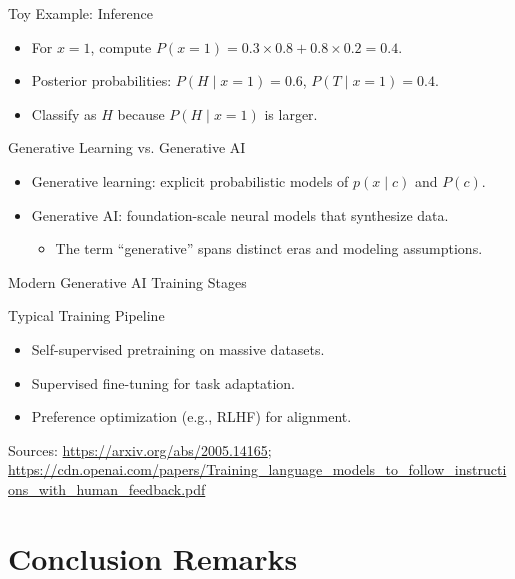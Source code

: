 \documentclass[10pt]{beamer}
\begin{document}
\begin{frame}{Toy Example: Inference}
    \justifying
    \begin{itemize}
        \item For $x=1$, compute $P(x=1)=0.3\times0.8+0.8\times0.2=0.4$.
        \item Posterior probabilities: $P(H \mid x=1)=0.6$, $P(T \mid x=1)=0.4$.
        \item Classify as $H$ because $P(H \mid x=1)$ is larger.
    \end{itemize}
\end{frame}

\begin{frame}{Generative Learning vs. Generative AI}
    \justifying
    \begin{itemize}
        \item Generative learning: explicit probabilistic models of $p(x \mid c)$ and $P(c)$.
        \item Generative AI: foundation-scale neural models that synthesize data.
        \begin{itemize}
            \item The term ``generative'' spans distinct eras and modeling assumptions.
        \end{itemize}
    \end{itemize}
\end{frame}

\begin{frame}{Modern Generative AI Training Stages}
    \justifying
    \begin{conceptbox}{Typical Training Pipeline}
        \begin{itemize}
            \item Self-supervised pretraining on massive datasets.
            \item Supervised fine-tuning for task adaptation.
            \item Preference optimization (e.g., RLHF) for alignment.
        \end{itemize}
    \end{conceptbox}
    \vspace{0.5em}
    {\footnotesize Sources: \url{https://arxiv.org/abs/2005.14165};
    \url{https://cdn.openai.com/papers/Training_language_models_to_follow_instructions_with_human_feedback.pdf}}
\end{frame}

\section{Conclusion Remarks}
\end{document}
